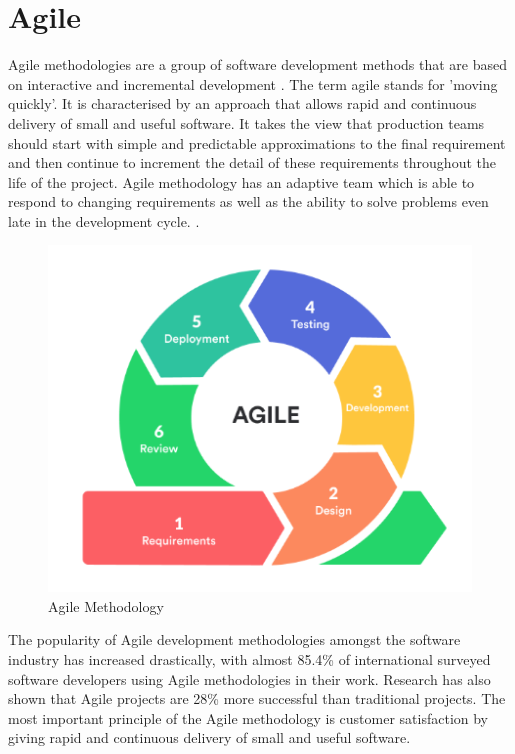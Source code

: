 \section{Agile}
Agile methodologies are a group of software development methods that are based on interactive and incremental development \cite{kumar2012impact}. The term agile stands for 'moving quickly'. It is characterised by an approach that allows rapid and continuous delivery of small and useful software. It takes the view  that production teams should start with simple and predictable approximations to the final requirement and then continue to increment the detail of these requirements throughout the life of the project. Agile methodology has an adaptive team which is able to respond to changing requirements as well as the ability to solve problems even late in the development cycle. \cite{balaji2012waterfall}.

\begin{figure}[ht]
    \centering
    \includegraphics[scale=0.8]{img/Agile.png}
    \caption{Agile Methodology}
    \label{fig:my_label1}
\end{figure}

The popularity of Agile development methodologies amongst the software industry has increased drastically, with almost 85.4\% of international surveyed software developers using Agile methodologies in their work. Research has also shown that Agile projects are 28\% more successful than traditional projects. The most important principle of the Agile methodology is customer satisfaction by giving rapid and continuous delivery of small and useful software.\cite{PopularityofAgile}



